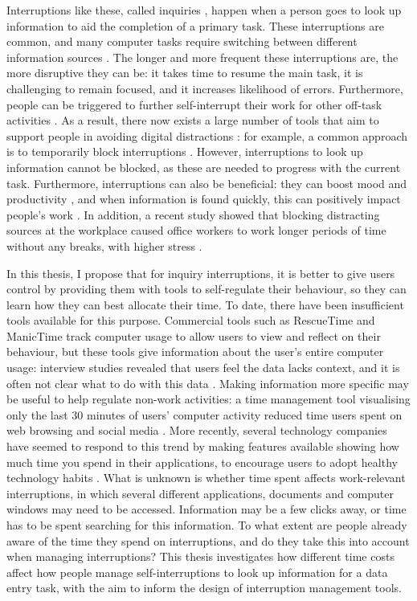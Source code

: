 Interruptions like these, called inquiries \citep{Jin2009}, happen when a person goes to look up information to aid the completion of a primary task. These interruptions are common, and many computer tasks require switching between  different information sources \citep{Cangiano2009}. The longer and more frequent these interruptions are, the more disruptive they can be: it takes time to resume the main task, it is challenging to remain focused, and it increases likelihood of errors. Furthermore, people can be triggered to further self-interrupt their work for other off-task activities \citep{Jin2009}. As a result, there now exists a large number of tools that aim to support people in avoiding digital distractions \citep{Lyngs2018}: for example, a common approach is to temporarily block interruptions \citep{Kim2017}. However, interruptions to look up information cannot be blocked, as these are needed to progress with the current task. Furthermore, interruptions can also be beneficial: they can boost mood and productivity \citep{Mark2014a}, and when information is found quickly, this can positively impact people’s work \citep{Jin2009}. In addition, a recent study showed that blocking distracting sources at the workplace caused office workers to work longer periods of time without any breaks, with higher stress \citep{Mark2018}.

In this thesis, I propose that for inquiry interruptions, it is better to give users control by providing them with tools to self-regulate their behaviour, so they can learn how they can best allocate their time. To date, there have been insufficient tools available for this purpose. Commercial tools such as RescueTime and ManicTime track computer usage to allow users to view and reflect on their behaviour, but these tools give information about the user’s entire computer usage: interview studies revealed that users feel the data lacks context, and it is often not clear what to do with this data \citep{Collins2014}. Making information more specific may be useful to help regulate non-work activities: a time management tool visualising only the last 30 minutes of users' computer activity reduced time users spent on web browsing and social media \citep{Whittaker2016}. More recently, several technology companies have seemed to respond to this trend by making features available showing how much time you spend in their applications, to encourage users to adopt healthy technology habits \citep{Constine2018, Lynley2018}. What is unknown is whether time spent affects work-relevant interruptions, in which several different applications, documents and computer windows may need to be accessed. Information may be a few clicks away, or time has to be spent searching for this information. To what extent are people already aware of the time they spend on interruptions, and do they take this into account when managing interruptions? This thesis investigates how different time costs affect how people manage self-interruptions to look up information for a data entry task, with the aim to inform the design of interruption management tools.

